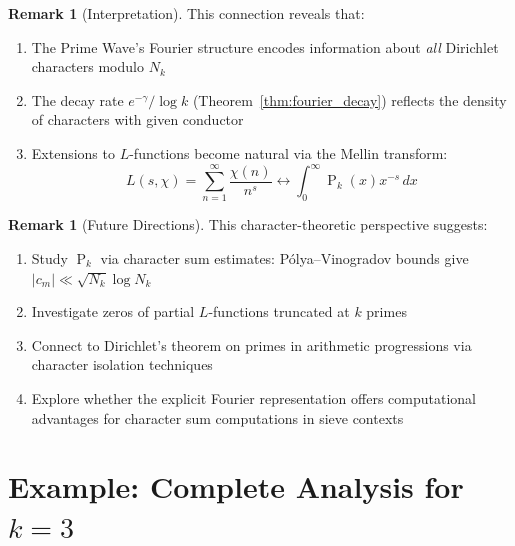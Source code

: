 ﻿\documentclass[12pt,a4paper]{report}
\theoremstyle{plain}
\theoremstyle{definition}
\newtheorem{remark}[theorem]{Remark}
\DeclareMathOperator{\Pk}{P}
\begin{document}
\begin{remark}[Interpretation]
This connection reveals that:
\begin{enumerate}
    \item The Prime Wave's Fourier structure encodes information about \emph{all} Dirichlet characters modulo $N_k$
    \item The decay rate $e^{-\gamma}/\log k$ (Theorem~\ref{thm:fourier_decay}) reflects the density of characters with given conductor
    \item Extensions to $L$-functions become natural via the Mellin transform:
    \[
    L(s, \chi) = \sum_{n=1}^\infty \frac{\chi(n)}{n^s} \leftrightarrow \int_0^\infty \Pk_k(x) x^{-s} \,dx
    \]
\end{enumerate}
\end{remark}

\begin{remark}[Future Directions]
This character-theoretic perspective suggests:
\begin{enumerate}
    \item Study $\Pk_k$ via character sum estimates: P\'olya--Vinogradov bounds give $|c_m| \ll \sqrt{N_k} \log N_k$
    \item Investigate zeros of partial $L$-functions truncated at $k$ primes
    \item Connect to Dirichlet's theorem on primes in arithmetic progressions via character isolation techniques
    \item Explore whether the explicit Fourier representation offers computational advantages for character sum computations in sieve contexts
\end{enumerate}
\end{remark}

\section{Example: Complete Analysis for $k=3$}
\end{document}
